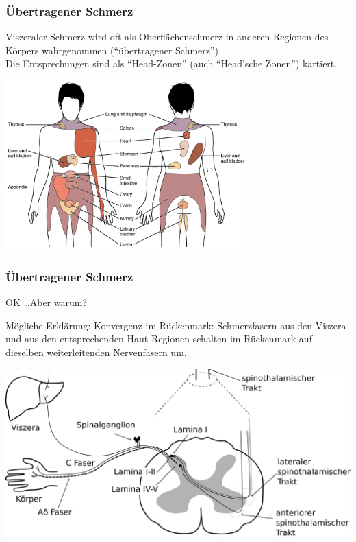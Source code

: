 \documentclass{beamer}
\begin{document}
\begin{frame}
\frametitle{Übertragener Schmerz}

Viszeraler Schmerz wird oft als Oberflächenschmerz in anderen Regionen des Körpers wahrgenommen (``übertragener Schmerz'') \\
Die Entsprechungen sind als ``Head-Zonen'' (auch ``Head'sche Zonen'') kartiert.


\begin{center}
\includegraphics[width=0.7\textwidth]{Referred_Pain_Chart.jpg}
\end{center}

\end{frame}

\begin{frame}
\frametitle{Übertragener Schmerz}

OK \dots Aber warum? 


Mögliche Erklärung: Konvergenz im Rückenmark: Schmerzfasern aus den Viszera und aus den entsprechenden Haut-Regionen schalten im Rückenmark auf dieselben weiterleitenden Nervenfasern um. \\


\begin{center}
\includegraphics[width=\textwidth]{Schmerz_aufsteigend_bis_Rueckenmark.png}
\end{center}



\end{frame}
\end{document}
